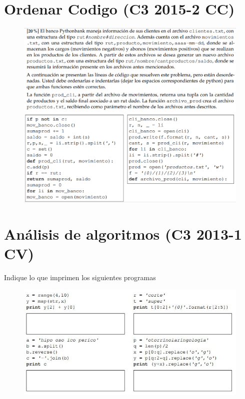 \section{Ordenar Codigo (C3 2015-2 CC)}
\begin{figure}[h]
    \centering
    \includegraphics[scale=0.55]{Imagenes/pregunta0.PNG}
\end{figure}
\newpage
\section{Análisis de algoritmos (C3 2013-1 CV)}
Indique lo que imprimen los siguientes programas
\begin{figure}[h]
    \centering
    \includegraphics{Imagenes/imagen0.jpg}
\end{figure}
